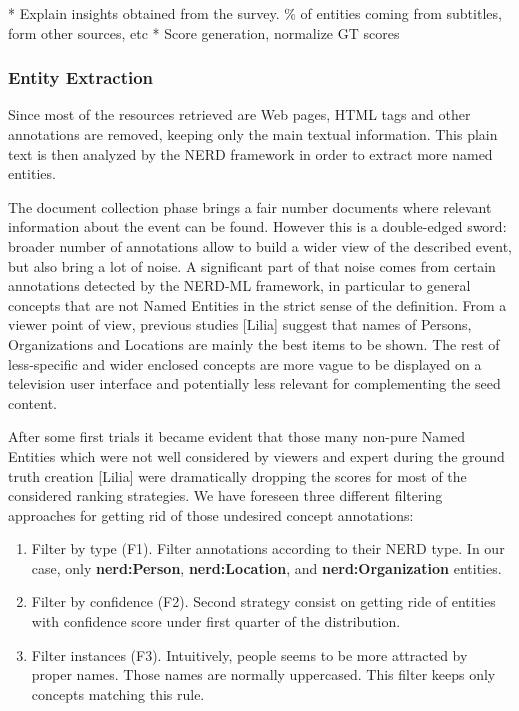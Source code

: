 \documentclass{llncs}
\begin{document}
* Explain insights obtained from the survey. \% of entities coming from subtitles, form other sources, etc
* Score generation, normalize GT scores

\subsubsection{Entity Extraction}
Since most of the resources retrieved are Web pages, HTML tags and other annotations are removed, keeping only the main textual information. This plain text is then analyzed by the NERD framework in order to extract more named entities.

The document collection phase brings a fair number documents where relevant information about the event can be found. However this is a double-edged sword: broader number of annotations allow to build a wider view of the described event, but also bring a lot of noise. A significant part of that noise comes from certain annotations detected by the NERD-ML framework, in particular to general concepts that are not Named Entities in the strict sense of the definition. From a viewer point of view, previous studies [Lilia] suggest that names of Persons, Organizations and Locations are mainly the best items to be shown. The rest of less-specific and wider enclosed concepts are more vague to be displayed on a television user interface and potentially less relevant for complementing the seed content.

After some first trials it became evident that those many non-pure Named Entities which were not well considered by viewers and expert during the ground truth creation [Lilia] were dramatically dropping the scores for most of the considered ranking strategies. We have foreseen three different filtering approaches for getting rid of those undesired concept annotations:

\begin{enumerate}
\item Filter by type (F1). Filter annotations according to their NERD type. In our case, only \textbf{nerd:Person}, \textbf{nerd:Location}, and \textbf{nerd:Organization} entities.
\item Filter by confidence (F2). Second strategy consist on getting ride of entities with confidence score under first quarter of the distribution.
\item Filter instances (F3). Intuitively, people seems to be more attracted by proper names. Those names are normally uppercased. This filter keeps only concepts matching this rule.
\end{enumerate}
\end{document}
